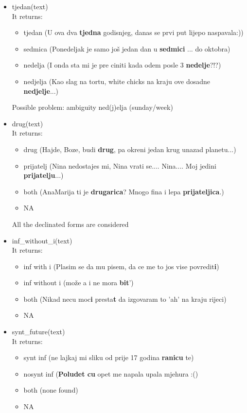 \documentclass[a4paper]{article}
\begin{document}
\begin{itemize}
\item tjedan(text)\\
It returns:
\begin{itemize}
\item tjedan (U ova dva \textbf{tjedna} godisnjeg, danas se prvi put lijepo naspavala:))
\item sedmica (Ponedeljak je samo još jedan dan u \textbf{sedmici} ... do oktobra)
\item nedelja (I onda sta mi je pre ciniti kada odem posle 3 \textbf{nedelje}?!?)
\item nedjelja (Kao slag na tortu, white chicks na kraju ove dosadne \textbf{nedjelje}...)
\end{itemize}
Possible problem: ambiguity ned(j)elja (sunday/week)

\item drug(text)\\
It returns:
\begin{itemize}
\item  drug (Hajde, Boze, budi \textbf{drug}, pa okreni jedan krug unazad planetu...)
\item prijatelj (Nina nedostajes mi, Nina vrati se.... Nina.... Moj jedini \textbf{prijatelju}...)
\item both (AnaMarija ti je \textbf{drugarica}? Mnogo fina i lepa \textbf{prijateljica}.)
\item NA
\end{itemize}
All the declinated forms are considered



\item inf\_without\_i(text)\\
It returns:
\begin{itemize}
\item inf with i (Plasim se da mu pisem, da ce me to jos vise povredit\textbf{i})
\item inf without i (može a i ne mora \textbf{bit}')
\item both (Nikad necu moc\textbf{i} presta\textbf{t }da izgovaram to 'ah' na kraju rijeci)
\item NA 
\end{itemize}

\item synt\_future(text)\\
It returns:
\begin{itemize}
\item synt inf (ne lajkaj mi sliku od prije 17 godina \textbf{ranicu} te)
\item nosynt inf (\textbf{Poludet cu} opet me napala upala mjehura :()
\item both (none found)
\item NA
\end{itemize}


\end{itemize}
\end{document}
